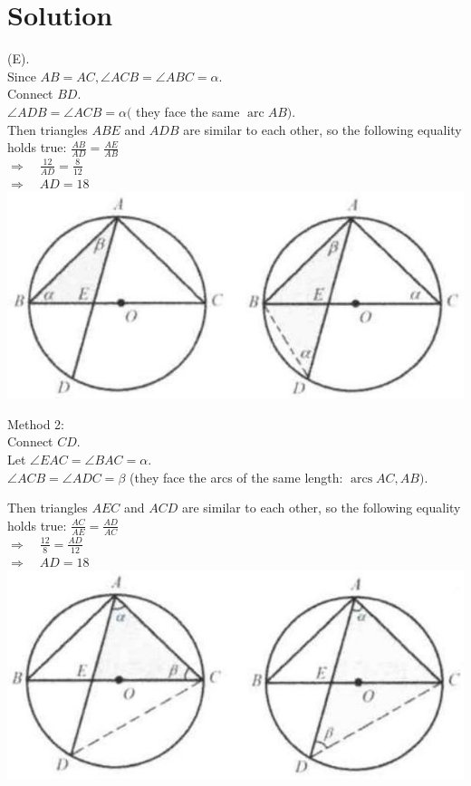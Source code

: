 \documentclass{article}
\begin{document}
\section*{Solution}
(E).\\
Since \(A B=A C, \angle A C B=\angle A B C=\alpha\).\\
Connect \(B D\).\\
\(\angle A D B=\angle A C B=\alpha(\) they face the same \(\operatorname{arc} A B)\).\\
Then triangles \(A B E\) and \(A D B\) are similar to each other, so the following equality holds true: \(\frac{A B}{A D}=\frac{A E}{A B}\)\\
\(\Rightarrow \quad \frac{12}{A D}=\frac{8}{12}\)\\
\(\Rightarrow \quad A D=18\)\\
\centering
\includegraphics[width=\textwidth]{images/174.jpg}

Method 2:\\
Connect \(C D\).\\
Let \(\angle E A C=\angle B A C=\alpha\).\\
\(\angle A C B=\angle A D C=\beta\) (they face the arcs of the same length: \(\operatorname{arcs} A C, A B)\).

Then triangles \(A E C\) and \(A C D\) are similar to each other, so the following equality holds true: \(\frac{A C}{A E}=\frac{A D}{A C}\)\\
\(\Rightarrow \quad \frac{12}{8}=\frac{A D}{12}\)\\
\(\Rightarrow \quad A D=18\)\\
\centering
\includegraphics[width=\textwidth]{images/174(1).jpg}
\end{document}
